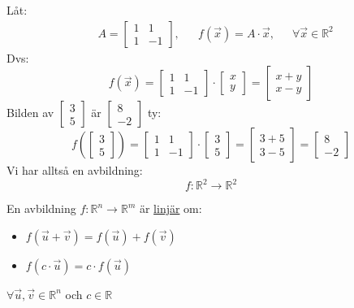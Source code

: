 \begin{Ex}
    Låt:
    \begin{align*}
    &A= \begin{bmatrix} 1&1\\1&-1 \end{bmatrix}, &&f(\vec{x}) = A \cdot \vec{x} \mbox{,  }\mbox{ }\mbox{ }\forall \vec{x} \in \mathbb{R}^2
    \end{align*}
    Dvs:
    \[
        f(\vec{x}) = \begin{bmatrix} 1&1\\1&-1 \end{bmatrix} \cdot \begin{bmatrix} x\\y \end{bmatrix} = \begin{bmatrix} x+y\\x-y \end{bmatrix}
    \]
    Bilden av $\begin{bmatrix} 3\\5 \end{bmatrix}$ är $\begin{bmatrix} 8\\-2 \end{bmatrix}$ ty:
    \[
        f(\begin{bmatrix} 3\\5 \end{bmatrix}) = \begin{bmatrix} 1&1\\1&-1 \end{bmatrix} \cdot \begin{bmatrix} 3\\5 \end{bmatrix} = \begin{bmatrix} 3+5\\3-5 \end{bmatrix} = \begin{bmatrix} 8\\-2 \end{bmatrix}
    \]
    Vi har alltså en avbildning:
	\[
	    f: \mathbb{R}^2 \rightarrow \mathbb{R}^2
	\]
\end{Ex}
\newpage
\begin{Def}
    En avbildning $f: \mathbb{R}^n \rightarrow \mathbb{R}^m$ är \underline{linjär} om:
    \begin{itemize}
    	\item $f(\vec{u} + \vec{v}) = f(\vec{u}) + f(\vec{v})$
    	\item $f(c \cdot \vec{u}) = c \cdot f(\vec{u})$
    \end{itemize}
    $\forall \vec{u}, \vec{v} \in \mathbb{R}^n$ och $c \in \mathbb{R}$
\end{Def}
